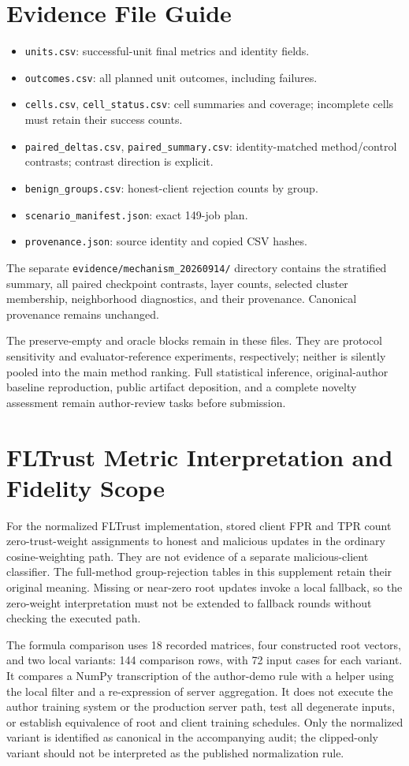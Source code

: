 \documentclass[journal]{IEEEtran}
\begin{document}
\section{Evidence File Guide}
\begin{itemize}
\item \texttt{units.csv}: successful-unit final metrics and identity fields.
\item \texttt{outcomes.csv}: all planned unit outcomes, including failures.
\item \texttt{cells.csv}, \texttt{cell\_status.csv}: cell summaries and coverage; incomplete cells must retain their success counts.
\item \texttt{paired\_deltas.csv}, \texttt{paired\_summary.csv}: identity-matched method/control contrasts; contrast direction is explicit.
\item \texttt{benign\_groups.csv}: honest-client rejection counts by group.
\item \texttt{scenario\_manifest.json}: exact 149-job plan.
\item \texttt{provenance.json}: source identity and copied CSV hashes.
\end{itemize}
The separate \texttt{evidence/mechanism\_20260914/} directory contains the stratified summary, all paired checkpoint contrasts, layer counts, selected cluster membership, neighborhood diagnostics, and their provenance. Canonical provenance remains unchanged.

The preserve-empty and oracle blocks remain in these files. They are protocol sensitivity and evaluator-reference experiments, respectively; neither is silently pooled into the main method ranking. Full statistical inference, original-author baseline reproduction, public artifact deposition, and a complete novelty assessment remain author-review tasks before submission.
\section{FLTrust Metric Interpretation and Fidelity Scope}
For the normalized FLTrust implementation, stored client FPR and TPR count zero-trust-weight assignments to honest and malicious updates in the ordinary cosine-weighting path. They are not evidence of a separate malicious-client classifier. The full-method group-rejection tables in this supplement retain their original meaning. Missing or near-zero root updates invoke a local fallback, so the zero-weight interpretation must not be extended to fallback rounds without checking the executed path.

The formula comparison uses 18 recorded matrices, four constructed root vectors, and two local variants: 144 comparison rows, with 72 input cases for each variant. It compares a NumPy transcription of the author-demo rule with a helper using the local filter and a re-expression of server aggregation. It does not execute the author training system or the production server path, test all degenerate inputs, or establish equivalence of root and client training schedules. Only the normalized variant is identified as canonical in the accompanying audit; the clipped-only variant should not be interpreted as the published normalization rule.
\end{document}
